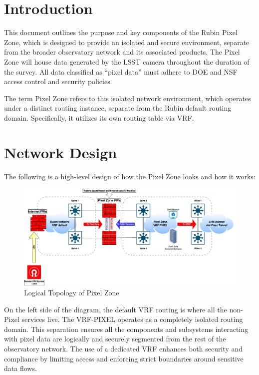 \section{Introduction}
This document outlines the purpose and key components of the Rubin Pixel Zone, which is designed to provide an isolated and secure environment, separate from the broader observatory network and its associated products. The Pixel Zone will house data generated by the LSST camera throughout the duration of the survey. All data classified as “pixel data” must adhere to DOE and NSF access control and security policies.

The term Pixel Zone refers to this isolated network environment, which operates under a distinct routing instance, separate from the Rubin default routing domain. Specifically, it utilizes its own routing table via VRF. 

\section{Network Design}

The following is a high-level design of how the Pixel Zone looks and how it works:

\begin{figure}
    \includegraphics[width=13cm]{pixel_zone.jpg}
    \centering
    \caption*{Logical Topology of Pixel Zone}
\end{figure}

On the left side of the diagram, the default VRF routing is where all the non-Pixel services live. The VRF-PIXEL operates as a completely isolated routing domain. This separation ensures all the components and subsystems interacting with pixel data are logically and securely segmented from the rest of the observatory network. The use of a dedicated VRF enhances both security and compliance by limiting access and enforcing strict boundaries around sensitive data flows.

